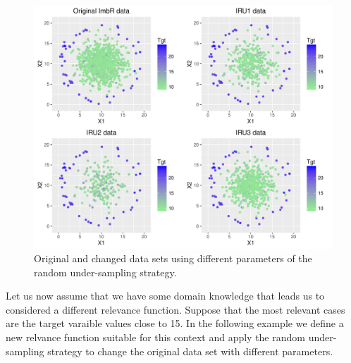 \documentclass[10pt,a4paper]{article}\usepackage[]{graphicx}\usepackage[]{color}
\makeatletter
\def\maxwidth{ %
  \ifdim\Gin@nat@width>\linewidth
    \linewidth
  \else
    \Gin@nat@width
  \fi
}
\newenvironment{knitrout}{}{} %
\makeatother
\begin{document}
\begin{knitrout}\footnotesize
{}\color{fgcolor}\begin{figure}

{\centering \includegraphics[width=\maxwidth]{figures/UBL-ImbR_RU_dist-1} 

}

\caption[Original and changed data sets using different parameters of the random under-sampling strategy]{Original and changed data sets using different parameters of the random under-sampling strategy.}\label{fig:ImbR_RU_dist}
\end{figure}


\end{knitrout}


Let us now assume that we have some domain knowledge that leads us to considered a different relevance function. Suppose that the most relevant cases are the target varaible values close to 15. In the following example we define a new relvance function suitable for this context and apply the random under-sampling strategy to change the original data set with different parameters.
\end{document}
